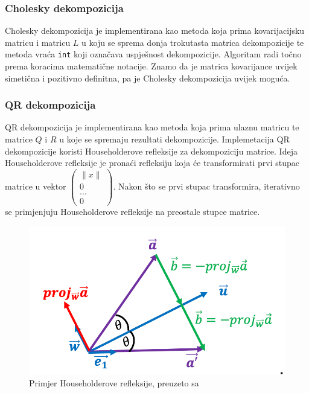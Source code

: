 \documentclass[zavrsnirad]{fer}
\begin{document}
\subsubsection{Cholesky dekompozicija}
\label{sek:cholesky_dekompozicija}
Cholesky dekompozicija je implementirana
kao metoda koja prima kovarijacijsku matricu i matricu $L$ u koju se sprema
donja trokutasta matrica dekompozicije te metoda vraća \texttt{int} koji
označava uspješnost dekompozicije.
Algoritam radi točno prema koracima matematične notacije.
Znamo da je matrica kovarijance uvijek simetična i
pozitivno definitna, pa je Cholesky dekompozicija uvijek moguća.

\subsubsection{QR dekompozicija}
\label{sek:qr_dekompozicija}
QR dekompozicija je implementirana kao metoda koja prima ulaznu matricu
te matrice $Q$ i $R$ u koje se spremaju rezultati dekompozicije.
Implemetacija QR dekompozicije koristi Householderove refleksije za
dekompoziciju matrice. Ideja Householderove refleksije je pronaći
refleksiju koja će transformirati prvi stupac matrice u vektor
$\begin{pmatrix} \|x\| \\ 0 \\ \dots \\ 0 \end{pmatrix}$.
Nakon što se prvi stupac transformira, iterativno se primjenjuju
Householderove refleksije na preostale stupce matrice.

\begin{figure}[H]
    \centering
    \includegraphics[width=1.0\textwidth]{Figures/householder.png}
    \caption{Primjer Householderove refleksije, preuzeto sa \cite{HouseholderSketch}}
    \label{fig:householder}
\end{figure}
\end{document}
